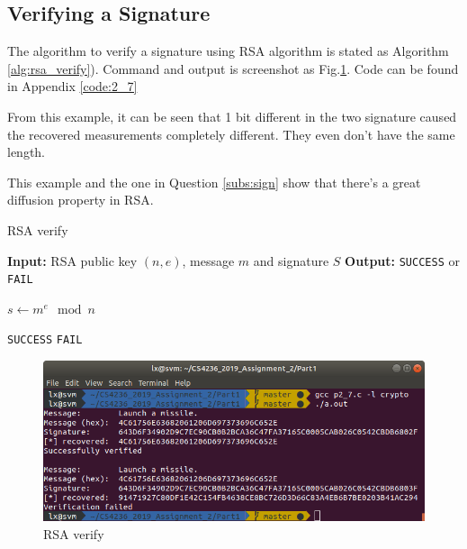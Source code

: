 \subsection{Verifying a Signature}

The algorithm to verify a signature using RSA algorithm is stated as Algorithm \ref{alg:rsa_verify}).
Command and output is screenshot as Fig.\ref{fig:p2_7}.
Code can be found in Appendix \ref{code:2_7}

From this example, it can be seen that 1 bit different in the two signature caused the recovered measurements completely different. They even don't have the same length.

This example and the one in Question \ref{subs:sign} show that there's a great diffusion property in RSA.

\begin{algorithm}
\caption{RSA verify}
\label{alg:rsa_verify}
\begin{algorithmic}
\STATE \textbf{Input:} RSA public key $(n, e)$, message $m$ and signature $S$
\STATE \textbf{Output:} \texttt{SUCCESS} or \texttt{FAIL}

\STATE $ s \gets m^e \mod{n} $

    \RETURN \texttt{SUCCESS}
\ELSE
    \RETURN \texttt{FAIL}
\ENDIF 

\end{algorithmic}
\end{algorithm}

\begin{figure}[b!]
\centering
\includegraphics[width=\columnwidth]{pictures/p2_7.png}
\caption{
    RSA verify
}
\label{fig:p2_7}
\end{figure}
